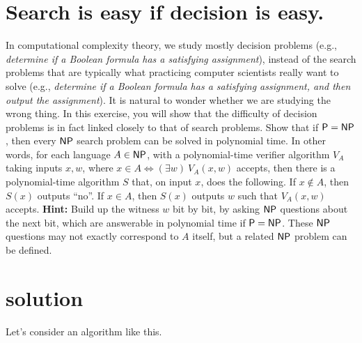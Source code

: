 
\newtheorem{theorem}{Theorem}

\maketitle
\thispagestyle{firststyle}
\vspace{-2.0cm}

\section{Search is easy if decision is easy.}
    In computational complexity theory, we study mostly decision problems
    (e.g., \emph{determine if a Boolean formula has a satisfying assignment}),
    instead of the search problems that are typically what practicing computer scientists really want to solve
    (e.g., \emph{determine if a Boolean formula has a satisfying assignment, and then output the assignment}).
    It is natural to wonder whether we are studying the wrong thing.
    In this exercise, you will show that the difficulty of decision problems is in fact linked closely to that of search problems.
        Show that if $\mathsf{P} = \mathsf{NP}$, then every $\mathsf{NP}$ search problem can be solved in polynomial time.
    In other words, for each language $A \in \mathsf{NP}$, with a polynomial-time verifier algorithm $V_A$ taking inputs $x,w$, where $x \in A \iff (\exists w)\ V_A(x,w)$ accepts, then there is a polynomial-time algorithm $S$ that, on input $x$, does the following.
    If $x \not\in A$, then $S(x)$ outputs ``no''.
    If $x \in A$, then $S(x)$ outputs $w$ such that $V_A(x,w)$ accepts.
        {\bf Hint:}
    Build up the witness $w$ bit by bit, by asking $\mathsf{NP}$ questions about the next bit, which are answerable in polynomial time if $\mathsf{P} = \mathsf{NP}$.
    These $\mathsf{NP}$ questions may not exactly correspond to $A$ itself, but a related $\mathsf{NP}$ problem can be defined.


\section*{solution}
Let's consider an algorithm like this.

